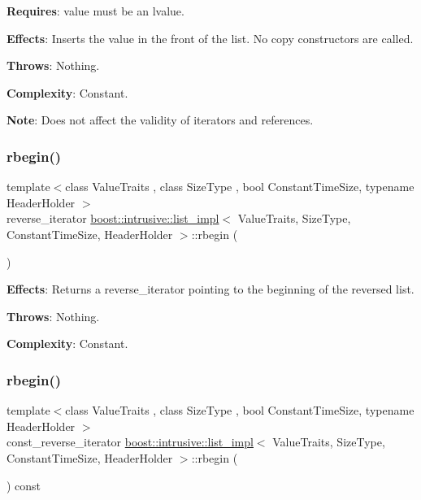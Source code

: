 {\bfseries Requires}\+: value must be an lvalue.

{\bfseries Effects}\+: Inserts the value in the front of the list. No copy constructors are called.

{\bfseries Throws}\+: Nothing.

{\bfseries Complexity}\+: Constant.

{\bfseries Note}\+: Does not affect the validity of iterators and references. \mbox{\label{classboost_1_1intrusive_1_1list__impl_a0073263f314407b1e94f63084e05b77e}} 
\subsubsection{\texorpdfstring{rbegin()}{rbegin()}\hspace{0.1cm}{\footnotesize\ttfamily [1/2]}}
{\footnotesize\ttfamily template$<$class Value\+Traits , class Size\+Type , bool Constant\+Time\+Size, typename Header\+Holder $>$ \\
reverse\+\_\+iterator \hyperlink{classboost_1_1intrusive_1_1list__impl}{boost\+::intrusive\+::list\+\_\+impl}$<$ Value\+Traits, Size\+Type, Constant\+Time\+Size, Header\+Holder $>$\+::rbegin (\begin{DoxyParamCaption}{ }\end{DoxyParamCaption})\hspace{0.3cm}{\ttfamily [inline]}}

{\bfseries Effects}\+: Returns a reverse\+\_\+iterator pointing to the beginning of the reversed list.

{\bfseries Throws}\+: Nothing.

{\bfseries Complexity}\+: Constant. \mbox{\label{classboost_1_1intrusive_1_1list__impl_a7a6e55dedd23bd303a71d764395420a8}} 
\subsubsection{\texorpdfstring{rbegin()}{rbegin()}\hspace{0.1cm}{\footnotesize\ttfamily [2/2]}}
{\footnotesize\ttfamily template$<$class Value\+Traits , class Size\+Type , bool Constant\+Time\+Size, typename Header\+Holder $>$ \\
const\+\_\+reverse\+\_\+iterator \hyperlink{classboost_1_1intrusive_1_1list__impl}{boost\+::intrusive\+::list\+\_\+impl}$<$ Value\+Traits, Size\+Type, Constant\+Time\+Size, Header\+Holder $>$\+::rbegin (\begin{DoxyParamCaption}{ }\end{DoxyParamCaption}) const\hspace{0.3cm}{\ttfamily [inline]}}

